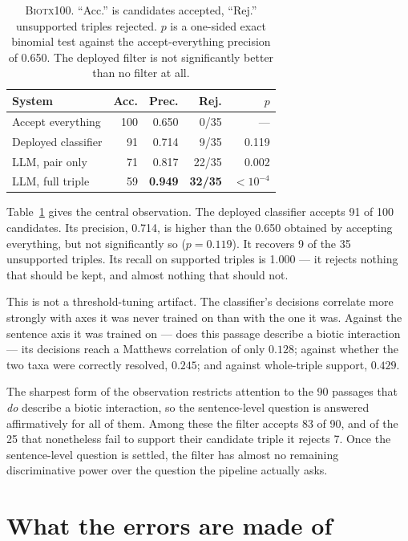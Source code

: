 \documentclass[11pt]{article}
\begin{document}
\begin{table}[t]\centering\small
\begin{tabular}{lrrrr}
\toprule
System & Acc. & Prec. & Rej. & $p$ \\
\midrule
Accept everything      & 100 & 0.650 & 0/35 & --- \\
Deployed classifier    &  91 & 0.714 & 9/35 & 0.119 \\
\midrule
LLM, pair only         &  71 & 0.817 & 22/35 & 0.002 \\
LLM, full triple       &  59 & \textbf{0.949} & \textbf{32/35} & $<10^{-4}$ \\
\bottomrule
\end{tabular}
\caption{\textsc{Biotx100}. ``Acc.'' is candidates accepted, ``Rej.'' unsupported triples
rejected. $p$ is a one-sided exact binomial test against the accept-everything precision of
0.650. The deployed filter is not significantly better than no filter at all.}
\label{tab:nofilter}
\end{table}

Table~\ref{tab:nofilter} gives the central observation. The deployed classifier accepts 91 of
100 candidates. Its precision, 0.714, is higher than the 0.650 obtained by accepting
everything, but not significantly so ($p = 0.119$). It recovers 9 of the 35 unsupported
triples. Its recall on supported triples is 1.000 --- it rejects nothing that should be kept,
and almost nothing that should not.

This is not a threshold-tuning artifact. The classifier's decisions correlate more strongly with
axes it was never trained on than with the one it was. Against the sentence axis it was trained
on --- does this passage describe a biotic interaction --- its decisions reach a Matthews
correlation of only $0.128$; against whether the two taxa were correctly resolved, $0.245$; and
against whole-triple support, $0.429$.

The sharpest form of the observation restricts attention to the 90 passages that \emph{do}
describe a biotic interaction, so the sentence-level question is answered affirmatively for all
of them. Among these the filter accepts 83 of 90, and of the 25 that nonetheless fail to support
their candidate triple it rejects 7. Once the sentence-level question is settled, the filter has
almost no remaining discriminative power over the question the pipeline actually asks.

\section{What the errors are made of}
\label{sec:decomp}
\end{document}
